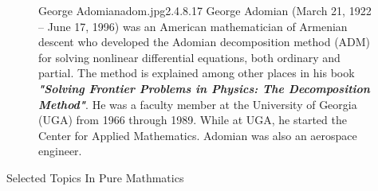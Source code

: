 \documentclass[]{article}
\begin{document}
\begin{figure}[b]
    \begin{enrichment}{George Adomian}{adom.jpg}{2.4}{.8}{.17}
        George Adomian (March 21, 1922 – June 17, 1996) 
        was an American mathematician of Armenian descent 
        who developed the Adomian decomposition method (ADM) 
        for solving nonlinear differential equations, 
        both ordinary and partial. 
        The method is explained among other places
        in his book \textit{\textbf{"Solving Frontier Problems in Physics: 
        The Decomposition Method"}}.
        He was a faculty member at the University of Georgia 
        (UGA) from 1966 through 1989. While at UGA, 
        he started the Center for Applied Mathematics. 
        Adomian was also an aerospace engineer.
    \end{enrichment}    
\end{figure}

\begingroup
\newpage
{}
\thispagestyle{empty}
\color{cover}
\begin{center}
    {
    \fontsize{20pt}{0}\handfont \color{white}
    Selected Topics In Pure Mathmatics
    }
\end{center}
\end{document}
